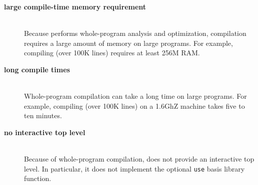 
\newcommand{\drawback}[1]{\item[\bf #1]\hspace{1in}\\}

\begin{description}

\drawback{large compile-time memory requirement}
Because {\mlton} performs whole-program analysis and optimization,
compilation requires a large amount of memory on large programs.  For
example, compiling {\mlton} (over 100K lines) requires at least 256M
RAM.

\drawback{long compile times}
Whole-program compilation can take a long time on large programs.  For
example, compiling {\mlton} (over 100K lines) on a 1.6GhZ machine
takes five to ten minutes.

\drawback{no interactive top level}
Because of whole-program compilation, {\mlton} does not provide an
interactive top level.  In particular, it does not implement the
optional {\tt use} basis library function.

\end{description}
